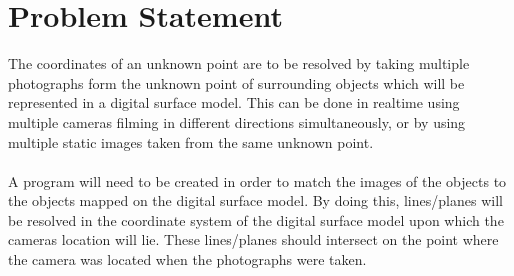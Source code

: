

\section{Problem Statement}
The coordinates of an unknown point are to be resolved by taking multiple photographs form the unknown point of surrounding objects which will be represented in a digital surface model. 
This can be done in realtime using multiple cameras filming in different directions simultaneously, or by using multiple static images taken from the same unknown point.

\paragraph{}
 A program will need to be created in order to match the images of the objects to the objects mapped on the digital surface model. 
 By doing this, lines/planes will be resolved in the coordinate system of the digital surface model upon which the cameras location will lie.
 These lines/planes should intersect on the point where the camera was located when the photographs were taken.

